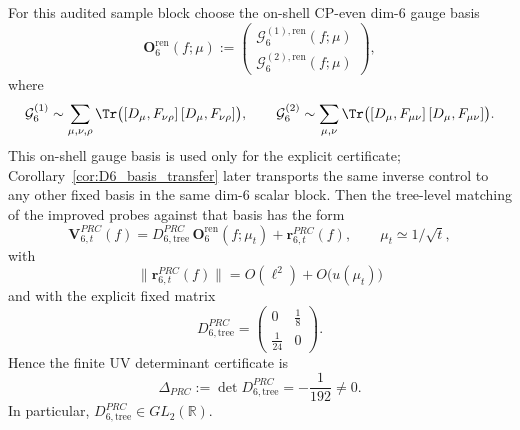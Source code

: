 \begin{proposition}\label{prop:D6_tree_certificate}
For this audited sample block choose the on-shell CP-even dim-$6$ gauge basis
\[
\mathbf O_{6}^{\mathrm{ren}}(f;\mu)
:=
\begin{pmatrix}
\mathcal G_{6}^{(1),\mathrm{ren}}(f;\mu)\\[0.35em]
\mathcal G_{6}^{(2),\mathrm{ren}}(f;\mu)
\end{pmatrix},
\]
where
\[
\mathcal G_{6}^{(1)}\sim \sum_{\mu,\nu,\rho}\Tr\big([D_\mu,F_{\nu\rho}]\,[D_\mu,F_{\nu\rho}]\big),
\qquad
\mathcal G_{6}^{(2)}\sim \sum_{\mu,\nu}\Tr\big([D_\mu,F_{\mu\nu}]\,[D_\mu,F_{\mu\nu}]\big).
\]
This on-shell gauge basis is used only for the explicit certificate; Corollary~\ref{cor:D6_basis_transfer} later transports the same inverse control to any other fixed basis in the same dim-$6$ scalar block.
Then the tree-level matching of the improved probes against that basis has the form
\begin{equation}\label{eq:D6_tree_matrix}
\mathbf V_{6,t}^{PRC}(f)
=
D_{6,\mathrm{tree}}^{PRC}\,\mathbf O_{6}^{\mathrm{ren}}(f;\mu_t)
+\mathbf r_{6,t}^{PRC}(f),
\qquad
\mu_t\simeq 1/\sqrt t,
\end{equation}
with
\[
\|\mathbf r_{6,t}^{PRC}(f)\|=O(\ell^2)+O\!\big(u(\mu_t)\big)
\]
and with the explicit fixed matrix
\begin{equation}\label{eq:D6_tree_det_matrix}
D_{6,\mathrm{tree}}^{PRC}
=
\begin{pmatrix}
0 & \frac18\\[0.45em]
\frac1{24} & 0
\end{pmatrix}.
\end{equation}
Hence the finite UV determinant certificate is
\begin{equation}\label{eq:D6_tree_det}
\Delta_{PRC}:=\det D_{6,\mathrm{tree}}^{PRC}
=
-\frac{1}{192}\neq 0.
\end{equation}
In particular, $D_{6,\mathrm{tree}}^{PRC}\in GL_2(\mathbb R)$.
\end{proposition}

